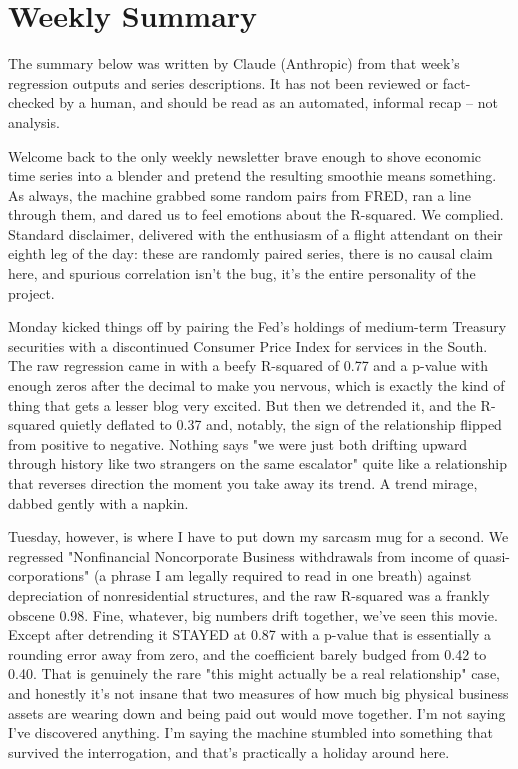 \section{Weekly Summary}

\begin{tcolorbox}[colback=yellow!10,colframe=black!50,title=AI-Generated Content]
\noindent The summary below was written by Claude (Anthropic) from that week's regression outputs and series descriptions. It has not been reviewed or fact-checked by a human, and should be read as an automated, informal recap -- not analysis.
\end{tcolorbox}

Welcome back to the only weekly newsletter brave enough to shove economic time series into a blender and pretend the resulting smoothie means something. As always, the machine grabbed some random pairs from FRED, ran a line through them, and dared us to feel emotions about the R-squared. We complied. Standard disclaimer, delivered with the enthusiasm of a flight attendant on their eighth leg of the day: these are randomly paired series, there is no causal claim here, and spurious correlation isn't the bug, it's the entire personality of the project.

Monday kicked things off by pairing the Fed's holdings of medium-term Treasury securities with a discontinued Consumer Price Index for services in the South. The raw regression came in with a beefy R-squared of 0.77 and a p-value with enough zeros after the decimal to make you nervous, which is exactly the kind of thing that gets a lesser blog very excited. But then we detrended it, and the R-squared quietly deflated to 0.37 and, notably, the sign of the relationship flipped from positive to negative. Nothing says "we were just both drifting upward through history like two strangers on the same escalator" quite like a relationship that reverses direction the moment you take away its trend. A trend mirage, dabbed gently with a napkin.

Tuesday, however, is where I have to put down my sarcasm mug for a second. We regressed "Nonfinancial Noncorporate Business withdrawals from income of quasi-corporations" (a phrase I am legally required to read in one breath) against depreciation of nonresidential structures, and the raw R-squared was a frankly obscene 0.98. Fine, whatever, big numbers drift together, we've seen this movie. Except after detrending it STAYED at 0.87 with a p-value that is essentially a rounding error away from zero, and the coefficient barely budged from 0.42 to 0.40. That is genuinely the rare "this might actually be a real relationship" case, and honestly it's not insane that two measures of how much big physical business assets are wearing down and being paid out would move together. I'm not saying I've discovered anything. I'm saying the machine stumbled into something that survived the interrogation, and that's practically a holiday around here.

